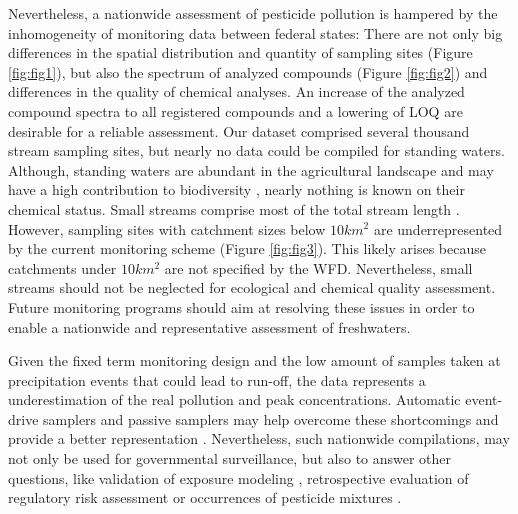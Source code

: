 \documentclass[journal=esthag,manuscript=article]{achemso}
\begin{document}
Nevertheless, a nationwide assessment of pesticide pollution is hampered by the inhomogeneity of monitoring data between federal states:
There are not only big differences in the spatial distribution and quantity of sampling sites (Figure \ref{fig:fig1}), but also the spectrum of analyzed compounds (Figure \ref{fig:fig2}) and differences in the quality of chemical analyses. 
An increase of the analyzed compound spectra to all registered compounds and a lowering of LOQ are desirable for a reliable assessment.
Our dataset comprised several thousand stream sampling sites, but nearly no data could be compiled for standing waters. 
Although, standing waters are abundant in the agricultural landscape and may have a high contribution to biodiversity \citep{davies_comparison_2008}, nearly nothing is known on their chemical status.
Small streams comprise most of the total stream length \citep{nadeau_hydrological_2007}.
However, sampling sites with catchment sizes below $10km^2$ are underrepresented by the current monitoring scheme (Figure \ref{fig:fig3}).
This likely arises because catchments under $10km^2$ are not specified by the WFD.
Nevertheless, small streams should not be neglected for ecological and chemical quality assessment.
Future monitoring programs should aim at resolving these issues in order to enable a nationwide and representative assessment of freshwaters. 

Given the fixed term monitoring design \citep{stehle_probabilistic_2013} and the low amount of samples taken at precipitation events that could lead to run-off, the data represents a underestimation of the real pollution and peak concentrations.
Automatic event-drive samplers and passive samplers may help overcome these shortcomings and provide a better representation \citep{fernandez_calibration_2014,moschet_evaluation_2015}.
Nevertheless, such nationwide compilations, may not only be used for governmental surveillance, but also to answer other questions, like validation of exposure modeling \cite{knabel_fungicide_2014}, retrospective evaluation of regulatory risk assessment \citep{knauer_pesticides_2016,stehle_pesticide_2015}or occurrences of pesticide mixtures \cite{schreiner_pesticide_2016}.
\end{document}
